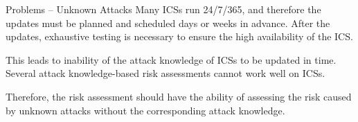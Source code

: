 \begin{frame}{Problems -- Unknown Attacks}\label{Introduction: Problem of Unknown Attacks}
    Many ICSs run 24/7/365, and therefore the updates must be planned and scheduled days or weeks in advance. After the updates, exhaustive testing is necessary to ensure the high availability of the ICS.
    
    \pause
    This leads to inability of the attack knowledge of ICSs to be updated in time. Several attack knowledge-based risk assessments cannot work well on ICSs.

    \pause
    Therefore, the risk assessment should have the ability of assessing the risk caused by unknown attacks without the corresponding attack knowledge.
\end{frame} 